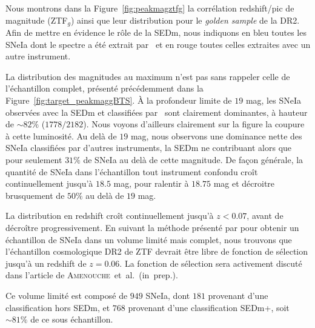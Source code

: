 \documentclass[../main/main.tex]{subfiles}
\begin{document}
Nous montrons dans la Figure~\ref{fig:peakmagztfg} la corrélation
redshift/pic de magnitude (ZTF$_{g}$) ainsi que leur distribution pour
le \textit{golden sample} de la DR2.
Afin de mettre en évidence le rôle de la SEDm, nous indiquons en bleu toutes les SNeIa dont le spectre a été extrait par
\hypergal\ et en rouge toutes celles extraites avec un autre instrument.

La distribution des magnitudes au maximum n'est pas sans rappeler celle
de l'échantillon complet, présenté précédemment dans la Figure~\ref{fig:target_peakmaggBTS}.
À la profondeur limite de $19$ mag, les SNeIa observées avec la SEDm et
classifiées par \hypergal\
sont clairement dominantes, à hauteur de $\sim82\%$ ($1778/2182$). Nous
voyons d'ailleurs clairement sur la figure
la coupure à cette luminosité. Au delà de $19$ mag, nous observons une dominance nette des
SNeIa classifiées par d'autres instruments, la SEDm ne contribuant alors que
pour seulement $31\%$ de SNeIa au delà de cette magnitude. De façon
générale, la quantité de SNeIa dans l'échantillon
tout instrument confondu croît 
continuellement jusqu'à $18.5$ mag, pour
ralentir à $18.75$ mag et décroitre brusquement de $50\%$ au delà de $19$
mag.

La distribution en redshift croît continuellement jusqu'à $z<0.07$,
avant de décroître progressivement. En suivant la méthode présenté par
\citet{NoraNicolas21} pour obtenir un échantillon de SNeIa dans un
volume limité mais complet, nous trouvons que l'échantillon cosmologique
DR2 de ZTF devrait être libre de fonction de sélection jusqu'à un
redshift de $z=0.06$. La fonction de sélection sera activement discuté dans
l'article de \mbox{\textsc{Amenouche} et al. (in prep.)}.

Ce volume limité est composé de $949$ SNeIa, dont $181$ provenant d'une
classification hors SEDm, et $768$ provenant d'une
classification SEDm+\hypergal, soit $\sim81\%$ de ce sous échantillon.
\end{document}
